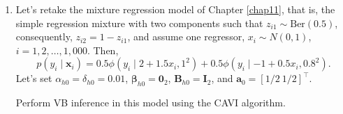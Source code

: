 \begin{enumerate}
\item Let's retake the mixture regression model of Chapter \ref{chap11}, that is, the simple regression mixture with two components such that $z_{i1}\sim \text{Ber}(0.5)$, consequently, $z_{i2}=1-z_{i1}$, and assume one regressor, $x_i\sim N(0,1)$, $i=1,2,\dots,1,000$. Then, 
$$p(y_i \mid \boldsymbol{x}_i) = 
0.5 \phi(y_i \mid 2+1.5x_i,1^2)+0.5 \phi(y_i \mid -1+0.5x_i,0.8^2).$$
Let's set $\alpha_{h0}=\delta_{h0}=0.01$, $\boldsymbol{\beta}_{h0}=\boldsymbol{0}_2$, $\boldsymbol{B}_{h0}=\boldsymbol{I}_2$, and $\boldsymbol{a}_0=[1/2 \ 1/2]^{\top}$.

Perform VB inference in this model using the CAVI algorithm.  
	
\end{enumerate}

